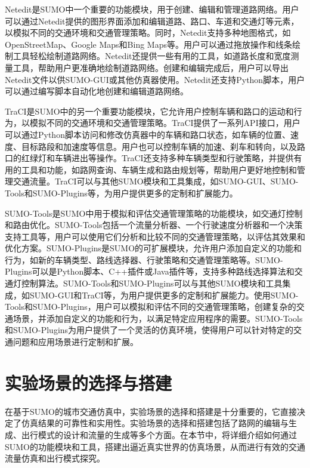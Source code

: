 Netedit是SUMO中一个重要的功能模块，用于创建、编辑和管理道路网络。用户可以通过Netedit提供的图形界面添加和编辑道路、路口、车道和交通灯等元素，以模拟不同的交通环境和交通管理策略。同时，Netedit支持多种地图格式，如OpenStreetMap、Google Maps和Bing Maps等。用户可以通过拖放操作和线条绘制工具轻松绘制道路网络。Netedit还提供一些有用的工具，如道路长度和宽度测量工具，帮助用户更准确地绘制道路网络。创建和编辑完成后，用户可以导出Netedit文件以供SUMO-GUI或其他仿真器使用。Netedit还支持Python脚本，用户可以通过编写脚本自动化地创建和编辑道路网络。

TraCI是SUMO中的另一个重要功能模块，它允许用户控制车辆和路口的运动和行为，以模拟不同的交通环境和交通管理策略。TraCI提供了一系列API接口，用户可以通过Python脚本访问和修改仿真器中的车辆和路口状态，如车辆的位置、速度、目标路段和加速度等信息。用户也可以控制车辆的加速、刹车和转向，以及路口的红绿灯和车辆进出等操作。TraCI还支持多种车辆类型和行驶策略，并提供有用的工具和功能，如路网查询、车辆生成和路由规划等，帮助用户更好地控制和管理交通流量。TraCI可以与其他SUMO模块和工具集成，如SUMO-GUI、SUMO-Tools和SUMO-Plugins等，为用户提供更多的定制和扩展能力。

SUMO-Tools是SUMO中用于模拟和评估交通管理策略的功能模块，如交通灯控制和路由优化。SUMO-Tools包括一个流量分析器、一个行驶速度分析器和一个决策支持工具等，用户可以使用它们分析和比较不同的交通管理策略，以评估其效果和优化方案。SUMO-Plugins是SUMO的可扩展模块，允许用户添加自定义的功能和行为，如新的车辆类型、路线选择器、行驶策略和交通管理策略等。SUMO-Plugins可以是Python脚本、C++插件或Java插件等，支持多种路线选择算法和交通灯控制算法。SUMO-Tools和SUMO-Plugins可以与其他SUMO模块和工具集成，如SUMO-GUI和TraCI等，为用户提供更多的定制和扩展能力。使用SUMO-Tools和SUMO-Plugins，用户可以模拟和评估不同的交通管理策略，创建复杂的交通场景，并添加自定义的功能和行为，以满足特定应用程序的需要。SUMO-Tools和SUMO-Plugins为用户提供了一个灵活的仿真环境，使得用户可以针对特定的交通问题和应用场景进行定制和扩展。



\section{实验场景的选择与搭建}
\label{section:3.3}

在基于SUMO的城市交通仿真中，实验场景的选择和搭建是十分重要的，它直接决定了仿真结果的可靠性和实用性。实验场景的选择和搭建包括了路网的编辑与生成、出行模式的设计和流量的生成等多个方面。在本节中，将详细介绍如何通过SUMO的功能模块和工具，搭建出逼近真实世界的仿真场景，从而进行有效的交通流量仿真和出行模式探究。

